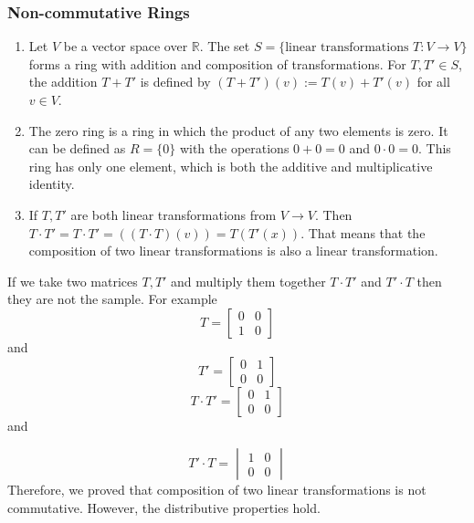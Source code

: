 \documentclass[11pt]{article}
\begin{document}
\subsubsection{Non-commutative Rings}
\begin{enumerate}
    \item Let \(V\) be a vector space over \(\mathbb{R}\). The set \(S = \{\text{linear
              transformations } T: V \to V\}\) forms a ring with addition and composition of
          transformations. For \(T, T' \in S\), the addition \(T + T'\) is defined by
          \((T + T')(v) := T(v) + T'(v)\) for all \(v \in V\).
    \item The zero ring is a ring in which the product of any two elements is zero. It
          can be defined as \( R = \{0\} \) with the operations \( 0 + 0 = 0 \) and \( 0
          \cdot 0 = 0 \). This ring has only one element, which is both the additive and
          multiplicative identity.
    \item If \(T, T'\) are both linear transformations from \(V \rightarrow V\). Then \(T \cdot T' = T \cdot T' = \left((T \cdot T)(v)  \right) = T(T'(x))\). That means that the composition of two linear transformations is also a linear transformation. 
\end{enumerate}
\begin{fact}
    If we take two matrices \(T, T'\) and multiply them together \(T \cdot T'\) and \(T' \cdot T\) then they are not the sample. For example
    \[T = \begin{bmatrix}
        0 & 0 \\    
1 & 0
    \end{bmatrix}\] and 
    \[T'=\begin{bmatrix}
        0 & 1 \\
        0 & 0
    \end{bmatrix}\]
    \[T \cdot T' = \begin{bmatrix}
        0 & 1 \\
        0 & 0
    \end{bmatrix}\] and

    \[T' \cdot T = \begin{vmatrix}
    1 & 0 \\
    0 & 0
    \end{vmatrix}\]
    Therefore, we proved that composition of two linear transformations is not commutative.
However, the distributive properties hold.
\end{fact}
\end{document}
